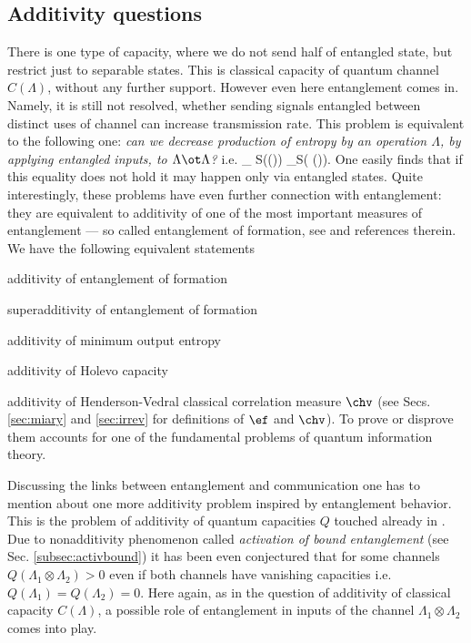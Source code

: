 \documentclass[twocolumn,aps,rmp]{revtex4}
\begin{document}
\subsection{Additivity questions}
There is one type of capacity, where we do not send half of
entangled state, but restrict just to separable states. This is
classical capacity of quantum channel $C(\Lambda)$, without any
further support. However even here entanglement comes in. Namely, it
is still not resolved, whether sending signals entangled between
distinct uses of channel can increase transmission rate. This
problem is equivalent to the following one: {\it can we decrease
production of entropy by an operation $\Lambda$, by applying
entangled inputs, to $\Lambda \ot \Lambda$?} i.e.
 \inf_\rho
S(\Lambda(\rho))  \inf_\rho S(\Lambda\ot
\Lambda(\rho)). \ee
One easily finds that if this  equality does not hold
it may happen only via entangled states. Quite
interestingly, these problems have even further connection with
entanglement: they are equivalent to additivity of one of the most
important measures of entanglement --- so called entanglement of
formation, see \cite{ShorAdditivity,AudenaertB2004,Matsumoto2005,KoashiW-monogamy} and references therein. We have
the following equivalent statements
\bei
\item additivity of entanglement of formation
\item superadditivity of entanglement of formation
\item additivity of minimum output entropy
\item additivity of Holevo capacity
\item additivity of Henderson-Vedral classical correlation measure  $\chv$
\eei
(see Secs. \ref{sec:miary} and \ref{sec:irrev} for definitions of $\ef$ and $\chv$).
To prove or disprove them  accounts  for one of
the fundamental problems of quantum information theory.


Discussing the links between entanglement and communication one has
to  mention about one more additivity problem inspired by
entanglement behavior. This is the problem of additivity of quantum
capacities $Q$ touched already in \cite{BDSW1996}.
Due to nonadditivity phenomenon called {\it activation of bound
entanglement} (see Sec. \ref{subsec:activbound}) it
has been even conjectured \cite{activation} that for some channels
$Q(\Lambda_{1} \otimes \Lambda_{2})>0$ even if both channels have
vanishing capacities i.e. $Q(\Lambda_{1})=Q(\Lambda_{2})=0$.
Here again, as in the question of additivity of classical capacity
$C(\Lambda)$, a possible role of entanglement in inputs of the
channel $\Lambda_{1} \otimes \Lambda_{2}$ comes into play.
\end{document}
